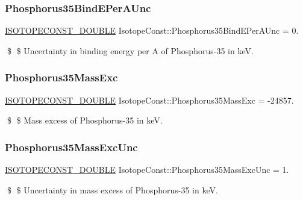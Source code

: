 \subsubsection{\texorpdfstring{Phosphorus35\+Bind\+E\+Per\+A\+Unc}{Phosphorus35BindEPerAUnc}}
{\footnotesize\ttfamily \mbox{\hyperlink{group___isotope_const-_macros_ga8f45a7272ce02c0b4c65c44636ed719a}{I\+S\+O\+T\+O\+P\+E\+C\+O\+N\+S\+T\+\_\+\+D\+O\+U\+B\+LE}} Isotope\+Const\+::\+Phosphorus35\+Bind\+E\+Per\+A\+Unc = 0.}

\$ \$ Uncertainty in binding energy per A of Phosphorus-\/35 in keV. \mbox{\label{group___isotope_const-_phosphorus-_p35_ga22daced46eeb781a0d5068e5f9c62fb9}} 
\subsubsection{\texorpdfstring{Phosphorus35\+Mass\+Exc}{Phosphorus35MassExc}}
{\footnotesize\ttfamily \mbox{\hyperlink{group___isotope_const-_macros_ga8f45a7272ce02c0b4c65c44636ed719a}{I\+S\+O\+T\+O\+P\+E\+C\+O\+N\+S\+T\+\_\+\+D\+O\+U\+B\+LE}} Isotope\+Const\+::\+Phosphorus35\+Mass\+Exc = -\/24857.}

\$ \$ Mass excess of Phosphorus-\/35 in keV. \mbox{\label{group___isotope_const-_phosphorus-_p35_ga619e17dcf00bc3bf5b2ca5e6a9aa3495}} 
\subsubsection{\texorpdfstring{Phosphorus35\+Mass\+Exc\+Unc}{Phosphorus35MassExcUnc}}
{\footnotesize\ttfamily \mbox{\hyperlink{group___isotope_const-_macros_ga8f45a7272ce02c0b4c65c44636ed719a}{I\+S\+O\+T\+O\+P\+E\+C\+O\+N\+S\+T\+\_\+\+D\+O\+U\+B\+LE}} Isotope\+Const\+::\+Phosphorus35\+Mass\+Exc\+Unc = 1.}

\$ \$ Uncertainty in mass excess of Phosphorus-\/35 in keV. \mbox{\label{group___isotope_const-_phosphorus-_p35_gab7d2c68b960fece77c1aac732d9d2b31}} 
